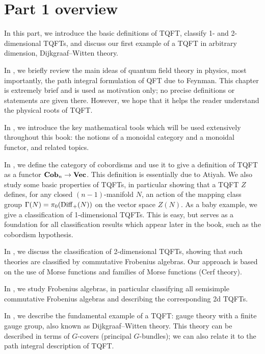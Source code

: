 \chapter*{Part 1 overview}%
In this part, we introduce the basic definitions of TQFT, classify 1- and
2-dimensional TQFTs, and discuss our first example of a TQFT in arbitrary
dimension, Dijkgraaf--Witten theory.

In , we briefly review the main ideas of quantum
field theory in physics, most importantly, the path integral formulation of QFT
due to Feynman. This chapter is extremely brief and is used as motivation only;
no precise definitions or statements are given there. However, we hope that it
helps the reader understand the physical roots of TQFT.

In , we introduce the key mathematical tools which will be
used extensively throughout this book: the notions of a monoidal category and a
monoidal functor, and related topics.

In , we define the category of cobordisms and use
it to give a definition of TQFT as a functor $\mathbf{Cob}_n\to \mathbf{Vec}$. This definition
is essentially due to Atiyah. We also study some basic properties of TQFTs, in
particular showing that a TQFT $Z$ defines, for any closed $(n-1)$-manifold
$N$, an action of the mapping class group $\Gamma(N)=\pi_0(\operatorname{Diff}_+(N))$ on the
vector space $Z(N)$. As a baby example, we give a classification of
1-dimensional TQFTs. This is easy, but serves as a foundation for all
classification results which appear later in the book, such as the cobordism
hypothesis.

In , we discuss the classification of 2-dimensional
TQFTs, showing that such theories are classified by commutative Frobenius
algebras. Our approach is based on the use of Morse functions and families of
Morse functions (Cerf theory).

In , we study Frobenius algebras, in particular classifying
all semisimple commutative Frobenius algebras and describing the corresponding
2d TQFTs.

In , we describe the fundamental example of a TQFT: gauge theory
with a finite gauge group, also known as Dijkgraaf--Witten theory. This theory
can be described in terms of $G$-covers (principal $G$-bundles); we can also
relate it to the path integral description of TQFT.
